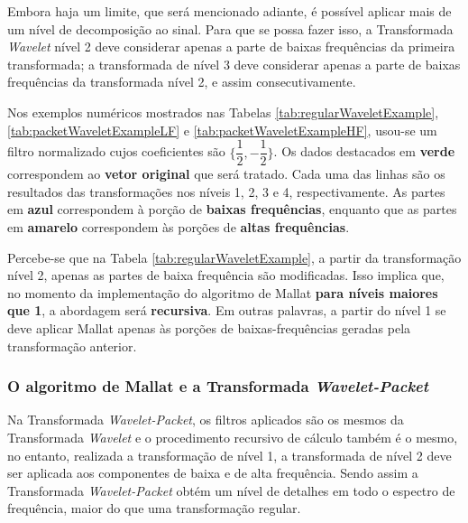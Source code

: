 \documentclass[a4paper,12pt,openright,oneside]{book}
\newenvironment{myenv}[1]
  {\begin{spacing}{#1}}
  {\end{spacing}}
\begin{document}
\begin{myenv}{1.5}
							\par Embora haja um limite, que será mencionado adiante, é possível aplicar mais de um nível de decomposição ao sinal. Para que se possa fazer isso, a Transformada \textit{Wavelet} nível 2 deve considerar apenas a parte de baixas frequências da primeira transformada; a transformada de nível 3 deve considerar apenas a parte de baixas frequências da transformada nível 2, e assim consecutivamente.
							
							\par Nos exemplos numéricos mostrados nas Tabelas \ref{tab:regularWaveletExample}, \ref{tab:packetWaveletExampleLF} e \ref{tab:packetWaveletExampleHF}, usou-se um filtro normalizado cujos coeficientes são $\{\dfrac{1}{2},-\dfrac{1}{2}\}$. Os dados destacados em \textbf{verde} correspondem ao \textbf{vetor original} que será tratado. Cada uma das linhas são os resultados das transformações nos níveis 1, 2, 3 e 4, respectivamente. As partes em \textbf{azul} correspondem à porção de \textbf{baixas frequências}, enquanto que as partes em \textbf{amarelo} correspondem às porções de \textbf{altas frequências}.
							
							\par Percebe-se que na Tabela \ref{tab:regularWaveletExample}, a partir da transformação nível 2, apenas as partes de baixa frequência são modificadas. Isso implica que, no momento da implementação do algoritmo de Mallat \textbf{para níveis maiores que 1}, a abordagem será \textbf{recursiva}. Em outras palavras, a partir do nível 1 se deve aplicar Mallat apenas às porções de baixas-frequências geradas pela transformação anterior.
							
							
				
						\subsubsection{O algoritmo de Mallat e a Transformada \textit{Wavelet-Packet}}
							\par Na Transformada \textit{Wavelet-Packet}, os filtros aplicados são os mesmos da Transformada \textit{Wavelet} e o procedimento recursivo de cálculo também é o mesmo, no entanto, realizada a transformação de nível 1, a transformada de nível 2 deve ser aplicada aos componentes de baixa e de alta frequência. Sendo assim a Transformada \textit{Wavelet-Packet} obtém um nível de detalhes em todo o espectro de frequência, maior do que uma transformação regular. 
							

\end{myenv}
\end{document}
